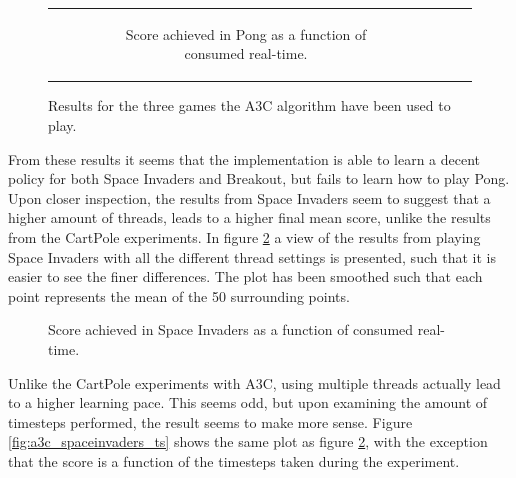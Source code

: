 \documentclass[11pt]{article}
\begin{document}
\begin{figure}[H]
\begin{tabular}[c]{ccc}
\begin{subfigure}[t]{.32\textwidth}
        \caption{Score achieved in Pong as a function of
        consumed real-time.}
    \end{subfigure}
  \end{tabular}
  \caption{Results for the three games the A3C algorithm have been used to play.}
  \label{fig:all_atari}
\end{figure}

From these results it seems that the implementation is able to learn
a decent policy for both Space Invaders and Breakout, but fails
to learn how to play Pong.
Upon closer inspection, the results from Space Invaders seem to suggest
that a higher amount of threads, leads to a higher final mean score,
unlike the results from the CartPole experiments.
In figure \ref{fig:a3c_spaceinvaders} a view of the results from
playing Space Invaders with all the different thread settings is presented,
such that it is easier to see the finer differences.
The plot has been smoothed such that each point represents the mean of the
50 surrounding points.

\begin{figure}[H]
    \caption{Score achieved in Space Invaders as a function of
    consumed real-time.}
    \label{fig:a3c_spaceinvaders}
\end{figure}

Unlike the CartPole experiments with A3C, using multiple threads
actually lead to a higher learning pace.
This seems odd, but upon examining the amount of timesteps performed,
the result seems to make more sense.
Figure \ref{fig:a3c_spaceinvaders_ts} shows the same plot as
figure \ref{fig:a3c_spaceinvaders}, with the
exception that the score is a function of the timesteps taken
during the experiment.
\end{document}
